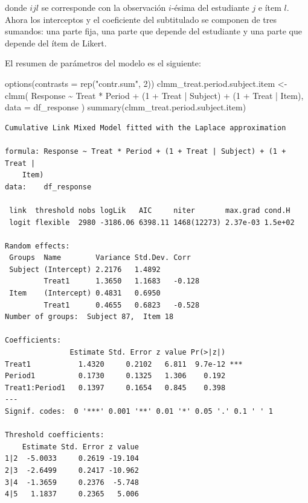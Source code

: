 \documentclass[
  12pt,
  a4paper,
  extrafontsizes,
  onecolumn,
  openright,
  table]{memoir}
\newenvironment{Shaded}{\begin{snugshade}}{\end{snugshade}}
\newcommand{\AttributeTok}[1]{\textcolor[rgb]{0.40,0.45,0.13}{#1}}
\newcommand{\DecValTok}[1]{\textcolor[rgb]{0.68,0.00,0.00}{#1}}
\newcommand{\FunctionTok}[1]{\textcolor[rgb]{0.28,0.35,0.67}{#1}}
\newcommand{\NormalTok}[1]{\textcolor[rgb]{0.00,0.23,0.31}{#1}}
\newcommand{\OtherTok}[1]{\textcolor[rgb]{0.00,0.23,0.31}{#1}}
\newcommand{\SpecialCharTok}[1]{\textcolor[rgb]{0.37,0.37,0.37}{#1}}
\newcommand{\StringTok}[1]{\textcolor[rgb]{0.13,0.47,0.30}{#1}}
\begin{document}
\normalsize

donde \(ijl\) se corresponde con la observación \(i\)-ésima del
estudiante \(j\) e ítem \(l\). Ahora los interceptos y el coeficiente
del subtitulado se componen de tres sumandos: una parte fija, una parte
que depende del estudiante y una parte que depende del ítem de Likert.

El resumen de parámetros del modelo es el siguiente:

\scriptsize

\begin{Shaded}
\begin{Highlighting}[]
\FunctionTok{options}\NormalTok{(}\AttributeTok{contrasts =} \FunctionTok{rep}\NormalTok{(}\StringTok{"contr.sum"}\NormalTok{, }\DecValTok{2}\NormalTok{))}
\NormalTok{clmm\_treat.period.subject.item }\OtherTok{\textless{}{-}} \FunctionTok{clmm}\NormalTok{(}
\NormalTok{    Response }\SpecialCharTok{\textasciitilde{}}\NormalTok{ Treat }\SpecialCharTok{*}\NormalTok{ Period }\SpecialCharTok{+}\NormalTok{ (}\DecValTok{1} \SpecialCharTok{+}\NormalTok{ Treat }\SpecialCharTok{|}\NormalTok{ Subject) }\SpecialCharTok{+}\NormalTok{ (}\DecValTok{1} \SpecialCharTok{+}\NormalTok{ Treat }\SpecialCharTok{|}\NormalTok{ Item),}
    \AttributeTok{data =}\NormalTok{ df\_response}
\NormalTok{)}
\FunctionTok{summary}\NormalTok{(clmm\_treat.period.subject.item)}
\end{Highlighting}
\end{Shaded}

\begin{verbatim}
Cumulative Link Mixed Model fitted with the Laplace approximation

formula: Response ~ Treat * Period + (1 + Treat | Subject) + (1 + Treat |  
    Item)
data:    df_response

 link  threshold nobs logLik   AIC     niter       max.grad cond.H 
 logit flexible  2980 -3186.06 6398.11 1468(12273) 2.37e-03 1.5e+02

Random effects:
 Groups  Name        Variance Std.Dev. Corr   
 Subject (Intercept) 2.2176   1.4892          
         Treat1      1.3650   1.1683   -0.128 
 Item    (Intercept) 0.4831   0.6950          
         Treat1      0.4655   0.6823   -0.528 
Number of groups:  Subject 87,  Item 18 

Coefficients:
               Estimate Std. Error z value Pr(>|z|)    
Treat1           1.4320     0.2102   6.811  9.7e-12 ***
Period1          0.1730     0.1325   1.306    0.192    
Treat1:Period1   0.1397     0.1654   0.845    0.398    
---
Signif. codes:  0 '***' 0.001 '**' 0.01 '*' 0.05 '.' 0.1 ' ' 1

Threshold coefficients:
    Estimate Std. Error z value
1|2  -5.0033     0.2619 -19.104
2|3  -2.6499     0.2417 -10.962
3|4  -1.3659     0.2376  -5.748
4|5   1.1837     0.2365   5.006
\end{verbatim}
\end{document}
